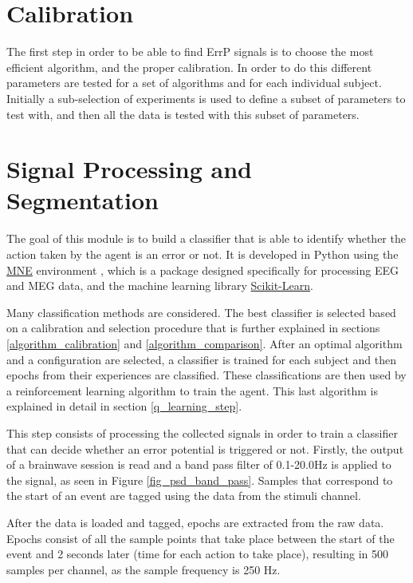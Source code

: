 \documentclass[journal]{IEEEtran}
\begin{document}
\section{Calibration}

The first step in order to be able to find ErrP signals is to choose the most efficient algorithm, and the proper calibration. In order to do this different parameters are tested for a set of algorithms and for each individual subject. Initially a sub-selection of experiments is used to define a subset of parameters to test with, and then all the data is tested with this subset of parameters.

\section{Signal Processing and Segmentation}

The goal of this module is to build a classifier that is able to identify whether the action taken by the agent is an error or not. It is developed in Python using the \href{https://mne-tools.github.io/0.11/index.html}{MNE} environment \cite{MNE-PYTHON}, which is a package designed specifically for processing EEG and MEG data, and the machine learning library \href{https://scikit-learn.org/stable/}{Scikit-Learn}.

Many classification methods are considered. The best classifier is selected based on a calibration and selection procedure that is further explained in sections \ref{algorithm_calibration} and \ref{algorithm_comparison}. After an optimal algorithm and a configuration are selected, a classifier is trained for each subject and then epochs from their experiences are classified. These classifications are then used by a reinforcement learning algorithm to train the agent. This last algorithm is explained in detail in section \ref{q_learning_step}.

This step consists of processing the collected signals in order to train a classifier that can decide whether an error potential is triggered or not. Firstly, the output of a brainwave session is read and a band pass filter of 0.1-20.0Hz is applied to the signal, as seen in Figure \ref{fig_psd_band_pass}. Samples that correspond to the start of an event are tagged using the data from the stimuli channel.

After the data is loaded and tagged, epochs are extracted from the raw data. Epochs consist of all the sample points that take place between the start of the event and 2 seconds later (time for each action to take place), resulting in 500 samples per channel, as the sample frequency is 250 Hz.
\end{document}
